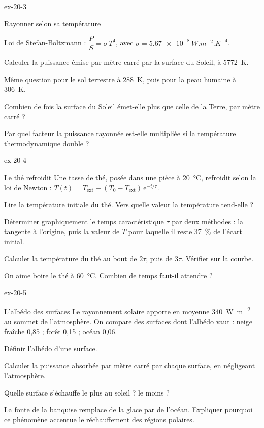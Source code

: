 \begin{blocLivre}{ex-20-3}
\begin{exercice}[1]{Rayonner selon sa température}
\begin{donnees}
Loi de Stefan-Boltzmann : $\dfrac{P}{S}=\sigma\,T^4$, avec $\sigma=\qty{5,67e-8}{W.m^{-2}.K^{-4}}$.
\end{donnees}
\begin{questions}
\item Calculer la puissance émise par mètre carré par la surface du Soleil, à \qty{5772}{K}.
\item Même question pour le sol terrestre à \qty{288}{K}, puis pour la peau humaine à \qty{306}{K}.
\item Combien de fois la surface du Soleil émet-elle plus que celle de la Terre, par mètre carré ?
\item Par quel facteur la puissance rayonnée est-elle multipliée si la température thermodynamique double ?
\end{questions}
\end{exercice}
\end{blocLivre}
\begin{blocLivre}{ex-20-4}
\begin{exercice}[1]{Le thé refroidit}
Une tasse de thé, posée dans une pièce à \qty{20}{\degreeCelsius}, refroidit selon la loi de Newton :
$T(t)=T_\mathrm{ext}+(T_0-T_\mathrm{ext})\,\mathrm{e}^{-t/\tau}$.
\begin{questions}
\item Lire la température initiale du thé. Vers quelle valeur la température tend-elle ?
\item Déterminer graphiquement le temps caractéristique $\tau$ par deux méthodes : la tangente à l'origine, puis la
valeur de $T$ pour laquelle il reste 37~\% de l'écart initial.
\item Calculer la température du thé au bout de $2\tau$, puis de $3\tau$. Vérifier sur la courbe.
\item On aime boire le thé à \qty{60}{\degreeCelsius}. Combien de temps faut-il attendre ?
\end{questions}
\end{exercice}
\end{blocLivre}
\begin{blocLivre}{ex-20-5}
\begin{exercice}[1]{L'albédo des surfaces}
Le rayonnement solaire apporte en moyenne \qty{340}{W.m^{-2}} au sommet de l'atmosphère. On compare des surfaces dont
l'albédo vaut : neige fraîche 0,85 ; forêt 0,15 ; océan 0,06.
\begin{questions}
\item Définir l'albédo d'une surface.
\item Calculer la puissance absorbée par mètre carré par chaque surface, en négligeant l'atmosphère.
\item Quelle surface s'échauffe le plus au soleil ? le moins ?
\item La fonte de la banquise remplace de la glace par de l'océan. Expliquer pourquoi ce phénomène accentue le
réchauffement des régions polaires.
\end{questions}
\end{exercice}
\end{blocLivre}
